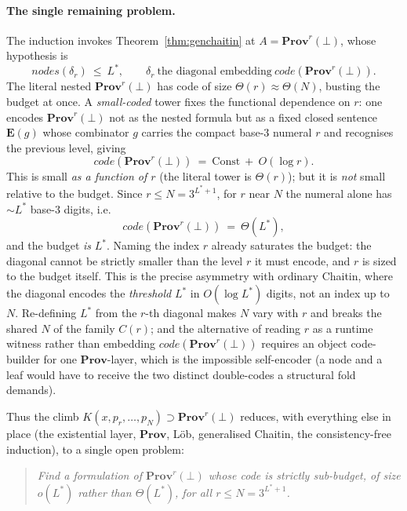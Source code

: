 \documentclass[11pt]{article}
\theoremstyle{plain}
\theoremstyle{definition}
\theoremstyle{remark}
\newcommand{\code}[1]{\mathit{code}(#1)}
\newcommand{\Ee}{\mathbf{E}}
\newcommand{\Prov}{\mathbf{Prov}}
\newcommand{\Lstar}{L^{*}}
\begin{document}
\paragraph{The single remaining problem.} The induction invokes
Theorem~\ref{thm:genchaitin} at $A=\Prov^r(\bot)$, whose hypothesis is
\[
  \mathit{nodes}(\delta_{r})\ \le\ \Lstar,\qquad
  \delta_{r}\ \text{the diagonal embedding}\ \code{\Prov^r(\bot)}.
\]
The literal nested $\Prov^r(\bot)$ has code of size $\Theta(r)\approx\Theta(N)$,
busting the budget at once. A \emph{small-coded} tower fixes the functional
dependence on $r$: one encodes $\Prov^r(\bot)$ not as the nested formula but as a
fixed closed sentence $\Ee(g)$ whose combinator $g$ carries the compact base-$3$
numeral $r$ and recognises the previous level, giving
\[
  \code{\Prov^r(\bot)}\ =\ \mathrm{Const}\ +\ O(\log r).
\]
This is small \emph{as a function of $r$} (the literal tower is $\Theta(r)$); but
it is \emph{not} small relative to the budget. Since $r\le N=3^{\Lstar+1}$, for
$r$ near $N$ the numeral alone has $\sim\Lstar$ base-$3$ digits, i.e.\
\[
  \code{\Prov^r(\bot)}\ =\ \Theta(\Lstar),
\]
and the budget \emph{is} $\Lstar$. Naming the index $r$ already saturates the
budget: the diagonal cannot be strictly smaller than the level $r$ it must
encode, and $r$ is sized to the budget itself. This is the precise asymmetry with
ordinary Chaitin, where the diagonal encodes the \emph{threshold} $\Lstar$ in
$O(\log\Lstar)$ digits, not an index up to $N$. Re-defining $\Lstar$ from the
$r$-th diagonal makes $N$ vary with $r$ and breaks the shared $N$ of the family
$C(r)$; and the alternative of reading $r$ as a runtime witness rather than
embedding $\code{\Prov^r(\bot)}$ requires an object code-builder for one
$\Prov$-layer, which is the impossible self-encoder (a node and a leaf would
have to receive the two distinct double-codes a structural fold demands).

\medskip
\noindent Thus the climb $K(x,p_r,\dots,p_N)\supset\Prov^r(\bot)$ reduces, with
everything else in place (the existential layer, $\Prov$, L\"ob, generalised
Chaitin, the consistency-free induction), to a single open problem:

\begin{quote}\itshape
Find a formulation of $\Prov^r(\bot)$ whose code is \emph{strictly sub-budget}, of
size $o(\Lstar)$ rather than $\Theta(\Lstar)$, for all $r\le N=3^{\Lstar+1}$.
\end{quote}

\end{document}
